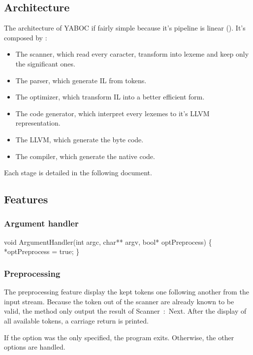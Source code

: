 \subsection{Architecture}
The architecture of \gls{YABOC} if fairly simple because it's pipeline is linear (\cf {}).
It's composed by :
\begin{itemize}
        \item The scanner, which read every caracter, transform into \gls{lexeme} and keep only the significant ones.
        \item The parser, which generate \gls{IL} from tokens.
        \item The optimizer, which transform \gls{IL} into a better efficient form.
        \item The code generator, which interpret every lexemes to it's LLVM representation.
        \item The LLVM, which generate the byte code.
        \item The compiler, which generate the native code.
\end{itemize}

\newpar Each stage is detailed in the following document.

\subsection{Features}
\subsubsection{Argument handler}
\TODO{}
\nwenddocs{}\endmoddef\nwstartdeflinemarkup\nwenddeflinemarkup
void ArgumentHandler(int argc, char** argv, bool* optPreprocess) \{
        *optPreprocess = true;
\}
\nwendcode{}\nwdocspar

\subsubsection{Preprocessing}
The preprocessing feature display the kept tokens one following another from the input stream. Because the token out of the scanner are already known to be valid, the method only output the result of {\Tt{}Scanner\ :\ Next\nwendquote}. After the display of all available tokens, a carriage return is printed.

\newpar If the option was the only specified, the program exits. Otherwise, the other options are handled.


